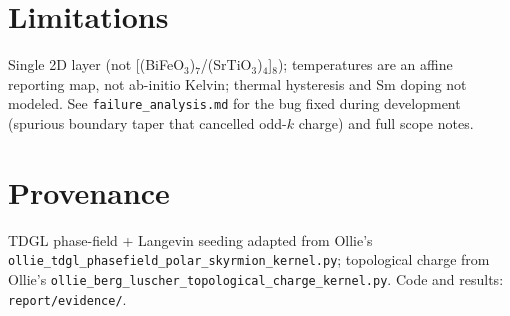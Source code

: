 \documentclass[11pt]{article}
\begin{document}
\section{Limitations}
Single 2D layer (not [(BiFeO$_3$)$_7$/(SrTiO$_3$)$_4$]$_8$); temperatures are an
affine reporting map, not ab-initio Kelvin; thermal hysteresis and Sm doping not
modeled. See \texttt{failure\_analysis.md} for the bug fixed during development
(spurious boundary taper that cancelled odd-$k$ charge) and full scope notes.

\section*{Provenance}
TDGL phase-field + Langevin seeding adapted from Ollie's
\texttt{ollie\_tdgl\_phasefield\_polar\_skyrmion\_kernel.py};
topological charge from Ollie's
\texttt{ollie\_berg\_luscher\_topological\_charge\_kernel.py}.
Code and results: \texttt{report/evidence/}.
\end{document}
